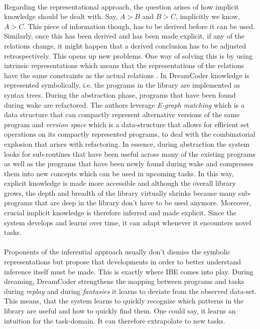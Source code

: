 \paragraph{} Regarding the representational approach, the question arises of how implicit knowledge should be dealt with. Say, $A > B$ and $B > C$, implicitly we know, $A > C$. This piece of information though, has to be derived before it can be used. Similarly, once this has been derived and has been made explicit, if any of the relations change, it might happen that a derived conclusion has to be adjusted retrospectively. This opens up new problems. One way of solving this is by using intrinsic representations which means that the representations of the relations have the same constraints as the actual relations \cite{palmer1978fundamental}. 
In DreamCoder knowledge is represented symbolically, i.e. the programs in the library are implemented as syntax trees. During the abstraction phase, programs that have been found during wake are refactored. The authors leverage \emph{E-graph matching} which is a data structure that can compactly represent alternative versions of the same program and \emph{version space} which is a data-structure that allows for efficient set operations on its compactly represented programs, to deal with the combinatorial explosion that arises with refactoring. In essence, during abstraction the system looks for sub-routines that have been useful across many of the existing programs as well as the programs that have been newly found during wake and compresses them into new concepts which can be used in upcoming tasks. In this way, explicit knowledge is made more accessible and although the overall library grows, the depth and breadth of the library virtually shrinks because many sub-programs that are deep in the library don't have to be used anymore. Moreover, crucial implicit knowledge is therefore inferred and made explicit. Since the system develops and learns over time, it can adapt whenever it encounters novel tasks.

\paragraph{} Proponents of the inferential approach usually don't dismiss the symbolic representations but propose that developments in order to better understand inference itself must be made. This is exactly where IBE comes into play. During dreaming, DreamCoder strengthens the mapping between programs and tasks during \emph{replay} and during \emph{fantasies} it learns to deviate from the observed data-set. This means, that the system learns to quickly recognize which patterns in the library are useful and how to quickly find them. One could say, it learns an intuition for the task-domain. It can therefore extrapolate to new tasks.

